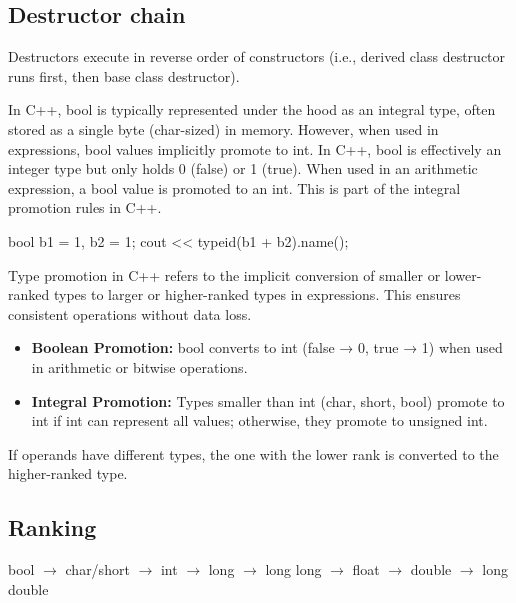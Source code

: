 \documentclass{report}
\begin{document}
    \subsection{Destructor chain}
    \bigbreak \noindent 
    Destructors execute in reverse order of constructors (i.e., derived class destructor runs first, then base class destructor).

    \pagebreak 
    \bigbreak \noindent 
    In C++, bool is typically represented under the hood as an integral type, often stored as a single byte (char-sized) in memory. However, when used in expressions, bool values implicitly promote to int.
    \bigbreak \noindent 
    In C++, bool is effectively an integer type but only holds 0 (false) or 1 (true).
    \bigbreak \noindent 
    When used in an arithmetic expression, a bool value is promoted to an int.
    \bigbreak \noindent 
    This is part of the integral promotion rules in C++.
    \bigbreak \noindent 
    \begin{cppcode}
        bool b1 = 1, b2 = 1;
        cout << typeid(b1 + b2).name();
    \end{cppcode}

    \pagebreak 
    \bigbreak \noindent 
    Type promotion in C++ refers to the implicit conversion of smaller or lower-ranked types to larger or higher-ranked types in expressions. This ensures consistent operations without data loss.
    \begin{itemize}
        \item \textbf{Boolean Promotion:} bool converts to int (false → 0, true → 1) when used in arithmetic or bitwise operations.
        \item \textbf{Integral Promotion:} Types smaller than int (char, short, bool) promote to int if int can represent all values; otherwise, they promote to unsigned int.
    \end{itemize}
    If operands have different types, the one with the lower rank is converted to the higher-ranked type.
    \bigbreak \noindent 
    \subsection{Ranking}
    \bigbreak \noindent 
    \begin{center}
        bool $\to$ char/short $\to$ int $\to$ long $\to$ long long $\to$ float $\to$ double $\to$ long double
    \end{center}
\end{document}

